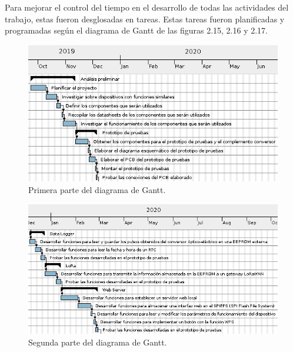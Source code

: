 Para mejorar el control del tiempo en el desarrollo de todas las actividades del trabajo, estas fueron desglosadas en tareas. Estas tareas fueron planificadas y programadas según el diagrama de Gantt de las figuras 2.15, 2.16 y 2.17.

\begin{figure}[h]
	\centering
	\includegraphics[scale=1]{./Figures/gantt1.png}
	\caption{Primera parte del diagrama de Gantt.}
	\label{fig:diagramAON}
\end{figure}

\begin{figure}[h]
	\centering
	\includegraphics[scale=1]{./Figures/gantt2.png}
	\caption{Segunda parte del diagrama de Gantt.}
	\label{fig:diagramAON}
\end{figure}


